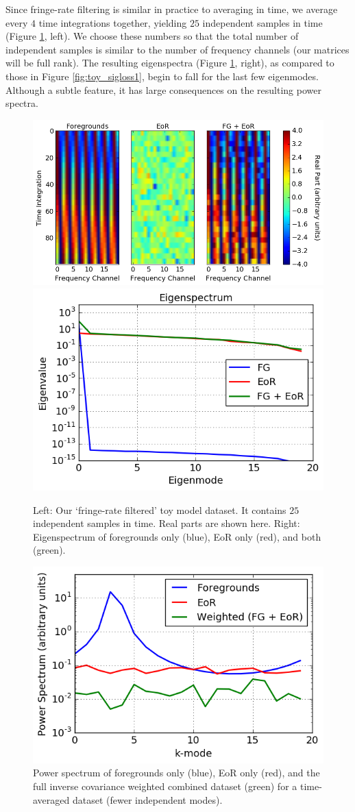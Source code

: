 \documentclass[preprint2,numberedappendix,tighten,twocolappendix]{aastex6}  %
\begin{document}
Since fringe-rate filtering is similar in practice to averaging in time, we average every $4$ time integrations together, yielding $25$ independent samples in time (Figure \ref{fig:toy_sigloss5}, left). We choose these numbers so that the total number of independent samples is similar to the number of frequency channels (our matrices will be full rank). The resulting eigenspectra (Figure \ref{fig:toy_sigloss5}, right), as compared to those in Figure \ref{fig:toy_sigloss1}, begin to fall for the last few eigenmodes. Although a subtle feature, it has large consequences on the resulting power spectra.

\begin{figure}
	\centering
	\includegraphics[height=0.3\textwidth]{plots/toy_sigloss5.png}
	\includegraphics[height=0.3\textwidth]{plots/toy_sigloss6.png}
	\caption{Left: Our `fringe-rate filtered' toy model dataset. It contains $25$ independent samples in time. Real parts are shown here. Right: Eigenspectrum of foregrounds only (blue), EoR only (red), and both (green).}
	\label{fig:toy_sigloss5}
\end{figure}

\begin{figure}
	\centering
	\includegraphics[width=\columnwidth]{plots/toy_sigloss7.png}
	\caption{Power spectrum of foregrounds only (blue), EoR only (red), and the full inverse covariance weighted combined dataset (green) for a time-averaged dataset (fewer independent modes).}
	\label{fig:toy_sigloss7}
\end{figure}
\end{document}
